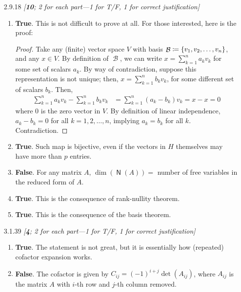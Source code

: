 \documentclass{amsart}
\theoremstyle{definition}
\theoremstyle{definition}
\DeclareMathOperator{\1}{\mathbbm{1}}
\DeclareMathOperator{\B}{\mathcal{B}}
\DeclareMathOperator{\nul}{\mathsf{N}}
\begin{document}
\begin{enumerate}[itemsep = 2mm]
		
		\item[2.9.18] \textit{[\textbf{10}; 2 for each part---1 for T/F, 1 for correct justification]}
		
		\begin{enumerate}
			\item \textbf{True}. This is not difficult to prove at all. For those interested, here is the proof:
			
			\bigskip
			
			\begin{proof}
				Take any (finite) vector space $V$ with basis $\B \coloneqq \set{v_1,v_2,\dots,v_n}$, and any $x \in V$. By definition of $\B$, we can write $x = \sum_{k=1}^{n} a_k v_k$ for some set of scalars $a_k$. By way of contradiction, suppose this representation is not unique; then, $x = \sum_{k=1}^{n} b_k v_k$, for some different set of scalars $b_k$.  Then,
				\begin{align*}
					\sum_{k=1}^{n} a_k v_k - \sum_{k=1}^{n} b_k v_k &= \sum_{k=1}^{n} (a_k - b_k) v_k = x - x = 0 
				\end{align*}
				where $0$ is the zero vector in $V$. By definition of linear independence, $a_k - b_k = 0 $ for all $k=1,2,\dots,n$, implying $a_k = b_k$ for all $k$. Contradiction.
			\end{proof}
			
			\item \textbf{True}. Such map is bijective, even if the vectors in $H$ themselves may have more than $p$ entries.
			
			\item \textbf{False}. For any matrix $A$, $\dim(\nul(A)) = $ number of free variables in the reduced form of $A$.
			
			\item \textbf{True}. This is the consequence of rank-nullity theorem.
			
			\item \textbf{True}. This is the consequence of the basis theorem.
		\end{enumerate}
		
		
		\item[3.1.39] \textit{[\textbf{4}; 2 for each part---1 for T/F, 1 for correct justification]}
		
		\begin{enumerate}
			\item \textbf{True}. The statement is not great, but it is essentially how (repeated) cofactor expansion works.
			
			
			\item \textbf{False}. The cofactor is given by $C_{ij} = (-1)^{i+j} \det (A_{ij})$, where $A_{ij}$ is the matrix $A$ with $i$-th row and $j$-th column removed.
		\end{enumerate}
		

\end{enumerate}
\end{document}
